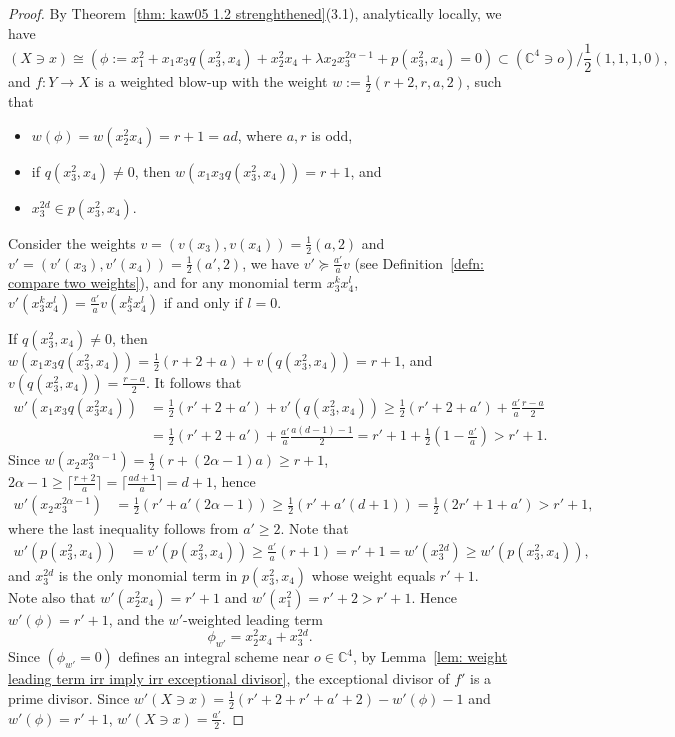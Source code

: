 \documentclass[11pt]{amsart}
\numberwithin{equation}{section}
\newcommand{\Cc}{\mathbb{C}}
\theoremstyle{definition}
\theoremstyle{definition}
\begin{document}
\begin{proof}
By Theorem~\ref{thm: kaw05 1.2 strenghthened}(3.1), analytically locally, we have  $$(X\ni x)\cong (\phi:= x_1^2+x_1x_3q(x_3^2,x_4)+x_2^2x_4+\lambda x_2x_3^{2\alpha-1}+p(x_3^2,x_4)=0)\subset (\mathbb C^4\ni o)/\frac{1}{2}(1,1,1,0),$$ and $f: Y\to X$ is a weighted blow-up with the weight $w:=\frac{1}{2}(r+2,r,a,2)$, such that 
\begin{itemize}
    \item $w(\phi)=w(x_2^2x_4)=r+1=ad$, where $a,r$ is odd,
    \item if $q(x^2_3,x_4)\not=0$, then $w(x_1x_3q(x_3^2,x_4))=r+1$, and
    \item $x_3^{2d}\in p(x_3^2,x_4)$.
\end{itemize}

Consider the weights $v=(v(x_3),v(x_4))=\frac{1}{2}(a,2)$ and $v'=(v'(x_3),v'(x_4))=\frac{1}{2}(a',2)$, we have $v'\succeq \frac{a'}{a}v$ (see Definition~\ref{defn: compare two weights}), and for any monomial term $x_3^{k}x_4^l$, $v'(x_3^{k}x_4^l)=\frac{a'}{a}v(x_3^{k}x_4^l)$ if and only if $l=0$.

If $q(x_3^2,x_4)\neq 0$, then $w(x_1x_3q(x_3^2,x_4))=\frac{1}{2}(r+2+a)+v(q(x_3^2,x_4))= r+1$, and $v(q(x_3^2,x_4))= \frac{r-a}{2}$. It follows that
\begin{align*}
    w'(x_1x_3q(x_3^2x_4))&=\frac{1}{2}(r'+2+a')+v'(q(x_3^2,x_4))\geq \frac{1}{2}(r'+2+a')+\frac{a'}{a}\frac{r-a}{2}\\
    &=\frac{1}{2}(r'+2+a')+\frac{a'}{a}\frac{a(d-1)-1}{2}=r'+1+\frac{1}{2}(1-\frac{a'}{a})> r'+1.
\end{align*}
Since $w(x_2x_3^{2\alpha-1})=\frac{1}{2}(r+(2\alpha-1)a)\geq r+1$, $2\alpha-1\geq \lceil\frac{r+2}{a}\rceil=\lceil\frac{ad+1}{a}\rceil=d+1$, hence
\begin{align*}
    w'(x_2x_3^{2\alpha-1})&=\frac{1}{2}(r'+a'(2\alpha-1))\geq \frac{1}{2}(r'+a'(d+1))=\frac{1}{2}(2r'+1+a')>r'+1,
\end{align*}
where the last inequality follows from $a'\geq 2$. Note that
\begin{align*}
    w'(p(x_3^2,x_4))&=v'(p(x_3^2,x_4))\geq\frac{a'}{a}(r+1)=r'+1=w'(x_3^{2d})\geq w'(p(x_3^2,x_4)),
\end{align*}
and $x_3^{2d}$ is the only monomial term in $p(x_3^2,x_4)$ whose weight equals $r'+1$. Note also that $w'(x_2^2x_4)=r'+1$ and $w'(x_1^2)=r'+2>r'+1$. Hence $w'(\phi)=r'+1$, and the $w'$-weighted leading term $$\phi_{w'}=x_2^2x_4+x_3^{2d}.$$ Since $(\phi_{w'}=0)$ defines an integral scheme near $o\in \Cc^4$, by Lemma~\ref{lem: weight leading term irr imply irr exceptional divisor}, the exceptional divisor of $f'$ is a prime divisor. Since $w'(X\ni x)=\frac{1}{2}(r'+2+r'+a'+2)-w'(\phi)-1$ and $w'(\phi)=r'+1$, $w'(X\ni x)=\frac{a'}{2}$.
\end{proof}
\end{document}
